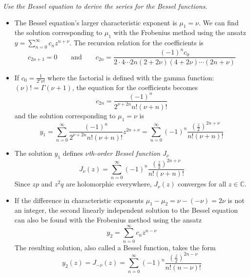 \documentclass[11pt, a4paper]{article}
\newcommand{\question}[1]{\textit{#1}\vspace{2mm}}
\newcommand{\C}{\mathbb{C}} %
\begin{document}
\question{Use the Bessel equation to derive the series for the Bessel functions.}
\begin{itemize}
	\item The Bessel equation's larger characteristic exponent is $ \mu_{1} = \nu $. We can find the solution corresponding to $ \mu_{1} $ with the Frobenius method using the ansatz $ y = \sum_{n=0}^{\infty}c_{n}z^{n+\nu} $. The recursion relation for the coefficients is
	\begin{equation*}
		c_{2n + 1}  = 0 \qquad \text{and} \qquad c_{2n} = \frac{(-1)^{n} c_{0}}{2\cdot 4 \cdots 2n(2 + 2\nu)(4 + 2\nu)\cdots (2n + \nu)}
	\end{equation*}
	
	\item If $ c_{0} = \frac{1}{2^{\nu}\nu!} $ where the factorial is defined with the gamma function: $ (\nu)! = \Gamma(\nu + 1) $, the equation for the coefficients becomes
	\begin{equation*}
		c_{2n} = \frac{(-1)^{n}}{2^{\nu + 2n}n! (\nu + n)!}
	\end{equation*}
	and the solution corresponding to $ \mu_{1} = \nu $ is
	\begin{equation*}
		y_{1} = \sum_{n= 0}^{\infty} \frac{(-1)^{n}}{2^{\nu + 2n}n! (\nu + n)!} z^{2n + \nu} = \sum_{n= 0}^{\infty} (-1)^{n}  \frac{\left(\frac{z}{2}\right)^{2n + \nu}}{n! (\nu + n)!}
	\end{equation*}
	
	\item The solution $ y_{1} $ defines \textit{$ \nu $th-order Bessel function} $ J_{\nu} $
	\begin{equation*}
		J_{\nu}(z) =  \sum_{n= 0}^{\infty} (-1)^{n}  \frac{\left(\frac{z}{2}\right)^{2n + \nu}}{n! (\nu + n)!}
	\end{equation*}
	Since $ zp  $ and $ z^{2}q $ are holomorphic everywhere, $ J_{\nu}(z) $ converges for all $ z \in \C $.
	
	\item If the difference in characteristic exponents $ \mu_{1} - \mu_{2} = \nu - (-\nu) = 2\nu$ is not an integer, the second linearly independent solution to the Bessel equation can also be found with the Frobenius method using the ansatz
	\begin{equation*}
		y_{2} = \sum_{n=0}^{\infty}c_{n} z^{n-\nu}
	\end{equation*}
	The resulting solution, also called a Bessel function, takes the form
	\begin{equation*}
		y_{2}(z) = J_{-\nu}(z) = \sum_{n= 0}^{\infty} (-1)^{n}  \frac{\left(\frac{z}{2}\right)^{2n - \nu}}{n! (n - \nu)!}
	\end{equation*}
	

\end{itemize}
\end{document}
